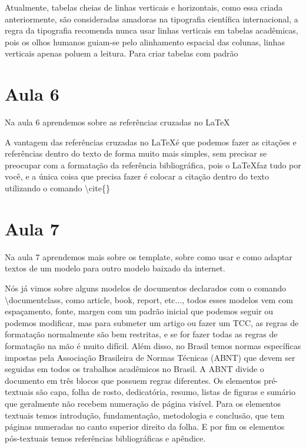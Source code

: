 Atualmente, tabelas cheias de linhas verticais e horizontais, como essa criada anteriormente, são consideradas amadoras na tipografia científica internacional, a regra da tipografia recomenda nunca usar linhas verticais em tabelas acadêmicas, pois os olhos humanos guiam-se pelo alinhamento espacial das colunas, linhas verticais apenas poluem a leitura. Para criar tabelas com padrão



\section{Aula 6}

Na aula 6 aprendemos sobre as referências cruzadas no \LaTeX

A vantagem das referências cruzadas no \LaTeX é que podemos fazer as citações e referências dentro do texto de forma muito mais simples, sem precisar se preocupar com a formatação da referência bibliográfica, pois o \LaTeX faz tudo por você, e a única coisa que precisa fazer é colocar a citação dentro do texto utilizando o comando \textbackslash cite\{\} \cite{michels2025real}

\section{Aula 7}

Na aula 7 aprendemos mais sobre os template, sobre como usar e como adaptar textos de um modelo para outro modelo baixado da internet.

Nós já vimos sobre alguns modelos de documentos declarados com o comando \textbackslash documentclass, como article, book, report, etc..., todos esses modelos vem com espaçamento, fonte, margen com um padrão inicial que podemos seguir ou podemos modificar, mas para submeter um artigo ou fazer um TCC, as regras de formatação normalmente são bem restritas, e se for fazer todas as regras de formatação na mão é muito difícil. Além disso, no Brasil temos normas específicas impostas pela Associação Brasileira de Normas Técnicas (ABNT) que devem ser seguidas em todos os trabalhos acadêmicos no Brasil. A ABNT divide o documento em três blocos que possuem regras diferentes. Os elementos pré-textuais são capa, folha de rosto, dedicatória, resumo, listas de figuras e sumário que geralmente não recebem numeração de página visível. Para os elementos textuais temos introdução, fundamentação, metodologia e conclusão, que tem páginas numeradas no canto superior direito da folha. E por fim os elementos pós-textuais temos referências bibliográficas e apêndice. 

